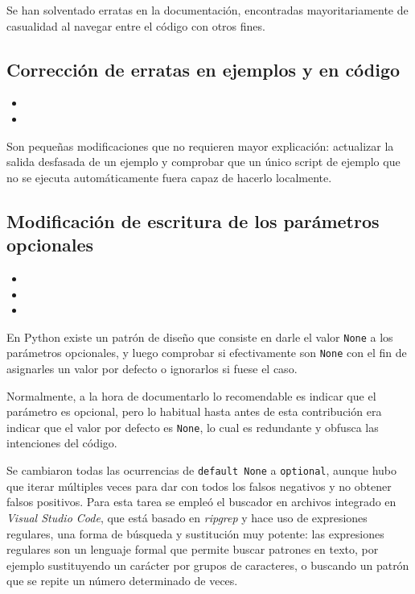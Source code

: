 Se han solventado erratas en la documentación, encontradas mayoritariamente de casualidad al navegar entre el código con otros fines.

\subsection{Corrección de erratas en ejemplos y en código}

\begin{itemize}
    \item {}
    \item {}
\end{itemize}

Son pequeñas modificaciones que no requieren mayor explicación: actualizar la salida desfasada de un ejemplo y comprobar que un único script de ejemplo que no se ejecuta automáticamente fuera capaz de hacerlo localmente.

\subsection{Modificación de escritura de los parámetros opcionales}

\begin{itemize}
    \item {}
    \item {}
    \item {}
\end{itemize}

En Python existe un patrón de diseño que consiste en darle el valor \texttt{None} a los parámetros opcionales, y luego comprobar si efectivamente son \texttt{None} con el fin de asignarles un valor por defecto o ignorarlos si fuese el caso.

Normalmente, a la hora de documentarlo lo recomendable es indicar que el parámetro es opcional, pero lo habitual hasta antes de esta contribución era indicar que el valor por defecto es \texttt{None}, lo cual es redundante y obfusca las intenciones del código.

Se cambiaron todas las ocurrencias de \texttt{default None} a \texttt{optional}, aunque hubo que iterar múltiples veces para dar con todos los falsos negativos y no obtener falsos positivos. Para esta tarea se empleó el buscador en archivos integrado en \textit{Visual Studio Code}, que está basado en \textit{ripgrep} y hace uso de expresiones regulares, una forma de búsqueda y sustitución muy potente: las expresiones regulares son un lenguaje formal que permite buscar patrones en texto, por ejemplo sustituyendo un carácter por grupos de caracteres, o buscando un patrón que se repite un número determinado de veces.

